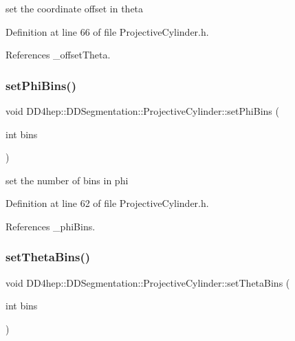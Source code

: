 set the coordinate offset in theta 



Definition at line 66 of file Projective\+Cylinder.\+h.



References \+\_\+offset\+Theta.

\hypertarget{class_d_d4hep_1_1_d_d_segmentation_1_1_projective_cylinder_a39fb4bdacbf4c6e929a2b3c70d51f7c4}{}\label{class_d_d4hep_1_1_d_d_segmentation_1_1_projective_cylinder_a39fb4bdacbf4c6e929a2b3c70d51f7c4} 
\subsubsection{\texorpdfstring{set\+Phi\+Bins()}{setPhiBins()}}
{\footnotesize\ttfamily void D\+D4hep\+::\+D\+D\+Segmentation\+::\+Projective\+Cylinder\+::set\+Phi\+Bins (\begin{DoxyParamCaption}\item[{int}]{bins }\end{DoxyParamCaption})\hspace{0.3cm}{\ttfamily [inline]}}



set the number of bins in phi 



Definition at line 62 of file Projective\+Cylinder.\+h.



References \+\_\+phi\+Bins.

\hypertarget{class_d_d4hep_1_1_d_d_segmentation_1_1_projective_cylinder_a24dee799078dacde34e689b0b834e141}{}\label{class_d_d4hep_1_1_d_d_segmentation_1_1_projective_cylinder_a24dee799078dacde34e689b0b834e141} 
\subsubsection{\texorpdfstring{set\+Theta\+Bins()}{setThetaBins()}}
{\footnotesize\ttfamily void D\+D4hep\+::\+D\+D\+Segmentation\+::\+Projective\+Cylinder\+::set\+Theta\+Bins (\begin{DoxyParamCaption}\item[{int}]{bins }\end{DoxyParamCaption})\hspace{0.3cm}{\ttfamily [inline]}}



